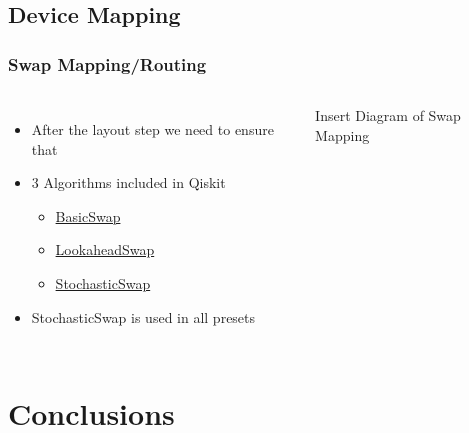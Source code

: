 \documentclass[aspectratio=169,11pt,hyperref={colorlinks=true}]{beamer}
\begin{document}
\subsection{Device Mapping}
\begin{frame}
    \frametitle{Swap Mapping/Routing}
    \begin{columns}
            \begin{itemize}
                \item After the layout step we need to ensure that 
                \item 3 Algorithms included in Qiskit
                    \begin{itemize}
                        \item \href{https://github.com/Qiskit/qiskit-terra/blob/master/qiskit/transpiler/passes/routing/basic_swap.py}{BasicSwap}
                        \item \href{https://github.com/Qiskit/qiskit-terra/blob/master/qiskit/transpiler/passes/routing/lookahead_swap.py}{LookaheadSwap}
                        \item \href{https://github.com/Qiskit/qiskit-terra/blob/master/qiskit/transpiler/passes/routing/stochastic_swap.py}{StochasticSwap}
                    \end{itemize}
                \item StochasticSwap is used in all presets
            \end{itemize}
            Insert Diagram of Swap Mapping
    \end{columns}
        
\end{frame}

\section{Conclusions}
\end{document}
